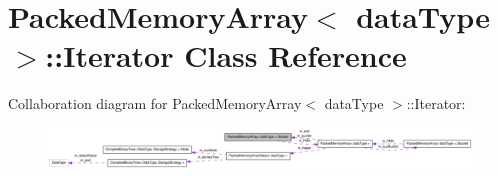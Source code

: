 \hypertarget{class_packed_memory_array_1_1_iterator}{
\section{PackedMemoryArray$<$ dataType $>$::Iterator Class Reference}
\label{class_packed_memory_array_1_1_iterator}
}


Collaboration diagram for PackedMemoryArray$<$ dataType $>$::Iterator:\nopagebreak
\begin{figure}[H]
\begin{center}
\leavevmode
\includegraphics[width=400pt]{class_packed_memory_array_1_1_iterator__coll__graph}
\end{center}
\end{figure}
